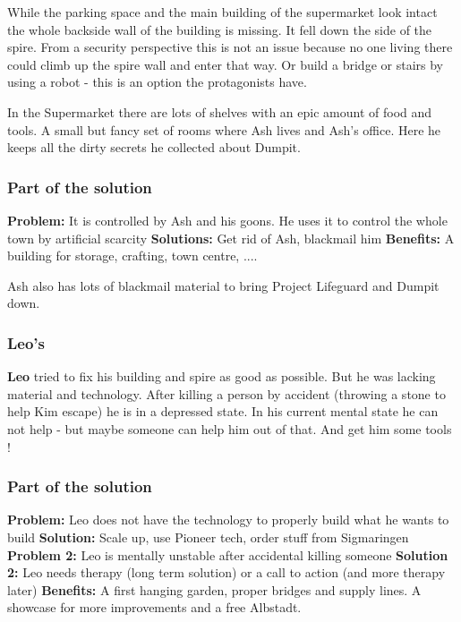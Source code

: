 While the parking space and the main building of the supermarket look intact the whole backside wall of the building is missing. It fell down the side of the spire. From a security perspective this is not an issue because no one living there could climb up the spire wall and enter that way. Or build a bridge or stairs by using a robot - this is an option the protagonists have.

In the Supermarket there are lots of shelves with an epic amount of food and tools. A small but fancy set of rooms where Ash lives and Ash's office. Here he keeps all the dirty secrets he collected about Dumpit.

\subsubsection{Part of the solution}

\textbf{Problem:} It is controlled by Ash and his goons. He uses it to control the whole town by artificial scarcity
\textbf{Solutions:} Get rid of Ash, blackmail him
\textbf{Benefits:} A building for storage, crafting, town centre, ....

Ash also has lots of blackmail material to bring Project Lifeguard and Dumpit down.

\subsubsection{Leo's}

\textbf{Leo} tried to fix his building and spire as good as possible. But he was lacking material and technology. After killing a person by accident (throwing a stone to help Kim escape) he is in a depressed state. In his current mental state he can not help - but maybe someone can help him out of that. And get him some tools !

\subsubsection{Part of the solution}

\textbf{Problem:} Leo does not have the technology to properly build what he wants to build
\textbf{Solution:} Scale up, use Pioneer tech, order stuff from Sigmaringen
\textbf{Problem 2:} Leo is mentally unstable after accidental killing someone
\textbf{Solution 2:} Leo needs therapy (long term solution) or a call to action (and more therapy later)
\textbf{Benefits:} A first hanging garden, proper bridges and supply lines. A showcase for more improvements and a free Albstadt.

